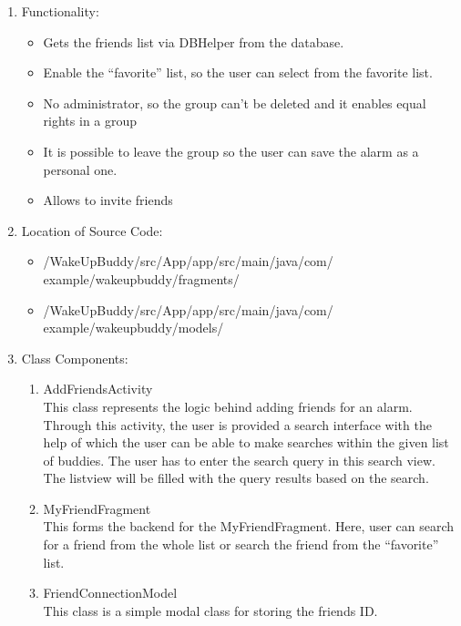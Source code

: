 \documentclass[conference]{IEEEtran}
\begin{document}
\begin{enumerate}
    \item Functionality: 
    \begin{itemize}
        \item Gets the friends list via DBHelper from the database.
        \item Enable the “favorite” list, so the user can select from the favorite list.
        \item No administrator, so the group can’t be deleted and it enables equal rights in a group
        \item It is possible to leave the group so the user can save the alarm as a personal one.
        \item Allows to invite friends
    \end{itemize} 
    \item Location of Source Code:
    \begin{itemize}
        \item /WakeUpBuddy/src/App/app/src/main/java/com/
        example/wakeupbuddy/fragments/
        \item /WakeUpBuddy/src/App/app/src/main/java/com/
        example/wakeupbuddy/models/
    \end{itemize} 
    \item Class Components:
    \begin{enumerate}
        \item AddFriendsActivity \\
        This class represents the logic behind adding friends for an alarm. Through this activity, the user is provided a search interface with the help of which the user can be able to make searches within the given list of buddies. The user has to enter the search query in this search view. The listview will be filled with the query results based on the search.
        \item MyFriendFragment \\
            This forms the backend for the MyFriendFragment. Here, user can search for a friend from the whole list or search the friend from the “favorite” list. 
        \item FriendConnectionModel \\
        This class is a simple modal class for storing the friends ID. 
        
    \end{enumerate}
\end{enumerate}
\end{document}
